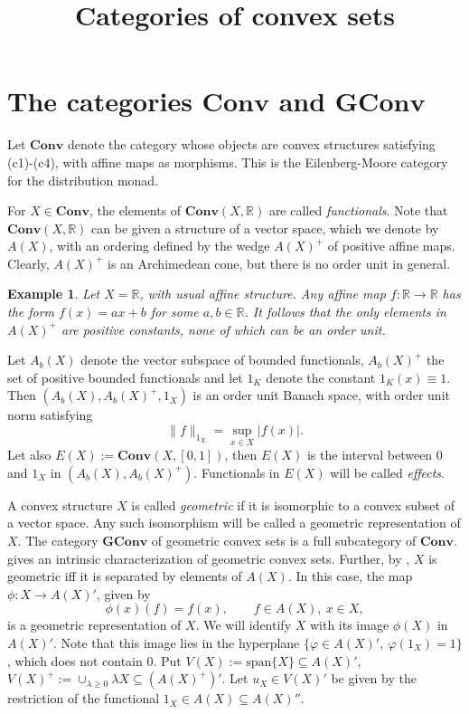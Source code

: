 \documentclass[12pt,letterpaper]{article}
\newtheorem{example}[lemma]{Example}
\newcommand{\ct}[1]{\mathbf{#1}}
\newcommand{\<}{\langle}
\begin{document}
\title{Categories of convex sets}
\maketitle





\section{The categories $\ct{Conv}$ and $\ct{GConv}$} 

Let $\ct{Conv}$ denote the category whose objects are convex structures satisfying (c1)-(c4), with affine maps as morphisms. This is the Eilenberg-Moore category for the distribution monad.

For $X\in \ct{Conv}$, the elements of $\ct{Conv}(X,\mathbb R)$ are called \emph{functionals}.
 Note that $\ct{Conv}(X,\mathbb R)$ can be given a structure of a vector space, which we denote by $A(X)$, with an ordering defined by the wedge $A(X)^+$ of positive affine maps. Clearly, $A(X)^+$ is an Archimedean cone, but there is no order unit in general.

\begin{example} Let $X=\mathbb R$, with usual affine structure. Any affine map $f:\mathbb R\to \mathbb R$ has the form $f(x)=ax+b$ for some $a,b\in \mathbb R$. It follows that the only elements in $A(X)^+$ are positive constants, none of which can be an order unit. 

\end{example}

Let $A_b(X)$ denote the vector subspace of bounded functionals, $A_b(X)^+$ the set of positive bounded functionals and let $1_K$ denote the constant $1_K(x)\equiv 1$. 
Then $(A_b(X),A_b(X)^+,1_X)$ is an  order unit Banach space, with order unit norm satisfying
\[
\|f\|_{1_X}=\sup_{x\in X} |f(x)|.
\]
Let also $E(X):=\ct{Conv}(X,[0,1])$, then $E(X)$ is the interval between 0 and $1_X$ in $(A_b(X),A_b(X)^+)$. Functionals in  $E(X)$ will be called \emph{effects}.





A convex structure $X$ is called \emph{geometric} if it is isomorphic to a convex subset of a vector space. Any such isomorphism will be called a geometric representation of $X$. The category $\ct{GConv}$ of geometric convex sets is a full subcategory of $\ct{Conv}$. \cite[Thm. 1.3]{convex} gives an intrinsic characterization of geometric convex sets. Further, by \cite[Thm. 1.2]{convex}, $X$ is geometric iff it is separated by elements of $A(X)$. In this case, the map $\phi: X\to A(X)'$, given by
\[
\phi(x)(f)=f(x),\qquad f\in A(X),\ x\in X,
\]
is a geometric representation of $X$.  We will identify $X$ with its image $\phi(X)$ in $A(X)'$.  Note that this image lies in the hyperplane $\{ \varphi\in A(X)',\ \varphi(1_X)=1\}$, which does not contain 0. 
  Put  $V(X):=\mathrm{span}\{X\}\subseteq A(X)'$, $V(X)^+:=\cup_{\lambda\ge 0} \lambda X\subseteq (A(X)^+)'$. Let $u_X\in V(X)'$ be given by the restriction of the functional $1_X\in A(X)\subseteq A(X)''$.
\end{document}
